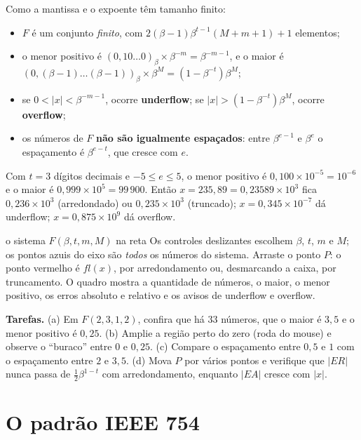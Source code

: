 Como a mantissa e o expoente têm tamanho finito:
\begin{itemize}[nosep]
  \item $F$ é um conjunto \emph{finito}, com $2(\beta-1)\beta^{t-1}(M+m+1)+1$ elementos;
  \item o menor positivo é $(0{,}10\dots0)_\beta\times\beta^{-m}=\beta^{-m-1}$, e o maior é
        $(0{,}(\beta{-}1)\dots(\beta{-}1))_\beta\times\beta^{M}=(1-\beta^{-t})\beta^{M}$;
  \item se $0<|x|<\beta^{-m-1}$, ocorre \textbf{underflow}; se $|x|>(1-\beta^{-t})\beta^{M}$,
        ocorre \textbf{overflow};
  \item os números de $F$ \textbf{não são igualmente espaçados}: entre $\beta^{e-1}$ e $\beta^{e}$ o
        espaçamento é $\beta^{e-t}$, que cresce com $e$.
\end{itemize}

\begin{exemplo}[{: $F(10,3,5,5)$}]
Com $t=3$ dígitos decimais e $-5\le e\le5$, o menor positivo é $0{,}100\times10^{-5}=10^{-6}$ e o maior é
$0{,}999\times10^{5}=99\,900$. Então
$x=235{,}89=0{,}23589\times10^{3}$ fica $0{,}236\times10^3$ (arredondado) ou $0{,}235\times10^3$
(truncado); $x=0{,}345\times10^{-7}$ dá underflow; $x=0{,}875\times10^{9}$ dá overflow.
\end{exemplo}

\begin{atividade}{o sistema $F(\beta,t,m,M)$ na reta}{\arqSisF}
Os controles deslizantes escolhem $\beta$, $t$, $m$ e $M$; os pontos azuis do eixo são \emph{todos}
os números do sistema. Arraste o ponto $P$: o ponto vermelho é $fl(x)$, por arredondamento ou,
desmarcando a caixa, por truncamento. O quadro mostra a quantidade de números, o maior, o menor
positivo, os erros absoluto e relativo e os avisos de underflow e overflow.

\textbf{Tarefas.} (a) Em $F(2,3,1,2)$, confira que há 33 números, que o maior é $3{,}5$ e o menor
positivo é $0{,}25$. (b) Amplie a região perto do zero (roda do mouse) e observe o ``buraco''
entre $0$ e $0{,}25$. (c) Compare o espaçamento entre $0{,}5$ e $1$ com o espaçamento entre $2$ e $3{,}5$.
(d) Mova $P$ por vários pontos e verifique que $|ER|$ nunca passa de $\tfrac12\beta^{1-t}$ com
arredondamento, enquanto $|EA|$ cresce com $|x|$.
\end{atividade}

\section{O padrão IEEE 754}

